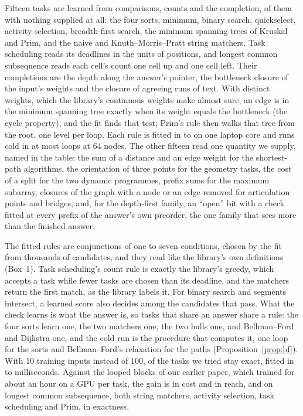 Fifteen tasks are learned from comparisons, counts and the completion,  of them with nothing
supplied at all: the four sorts, minimum, binary search, quickselect, activity selection, breadth-first search, the
minimum spanning trees of Kruskal and Prim, and the naive and Knuth--Morris--Pratt string matchers. Task scheduling reads
its deadlines in the units of positions, and longest common subsequence reads each cell's count one cell up and one cell
left. Their completions are the depth along the answer's pointer, the bottleneck closure of the input's weights and the
closure of agreeing runs of text. With distinct weights, which the library's continuous weights make almost sure, an edge
is in the minimum spanning tree exactly when its weight equals the bottleneck (the cycle property), and the fit finds that
test; Prim's rule then walks that tree from the root, one level per loop. Each rule is fitted in  to
 on one laptop core and runs cold in at most  loops at 64 nodes. The other fifteen
read one quantity we supply, named in the table: the sum of a distance and an edge weight for the shortest-path
algorithms, the orientation of three points for the geometry tasks, the cost of a split for the two dynamic programmes,
prefix sums for the maximum subarray, closures of the graph with a node or an edge removed for articulation points and
bridges, and, for the depth-first family, an ``open'' bit with a check fitted at every prefix of the answer's own
preorder, the one family that sees more than the finished answer.

The fitted rules are conjunctions of one to seven conditions, chosen by the fit from thousands of candidates, and they
read like the library's own definitions (Box~1). Task scheduling's count rule is exactly the library's greedy, which
accepts a task while fewer tasks are chosen than its deadline, and the matchers return the first match, as the library
labels it. For binary search and segments intersect, a learned score also decides among the candidates that pass. What
the check learns is what the answer is, so tasks that share an answer share a rule: the four sorts learn one, the two
matchers one, the two hulls one, and Bellman--Ford and Dijkstra one, and the cold run is the procedure that
computes it, one loop for the sorts and Bellman--Ford's relaxation for the paths (Proposition~\ref{prop:bf}). With 10
training inputs instead of 100,  of the  tasks we tried stay exact, fitted in
 to  milliseconds. Against the looped blocks of our earlier paper, which trained for about
an hour on a GPU per task\cite{mohsenvand2026zero}, the gain is in cost and in reach, and on longest common subsequence,
both string matchers, activity selection, task scheduling and Prim, in exactness.

